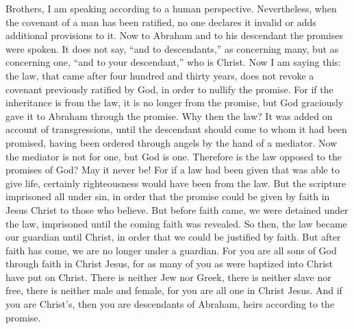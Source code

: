 \begin{biblechapter}
 Brothers, I am speaking according to a human perspective. Nevertheless, when the covenant of a man has been ratified, no one declares it invalid or adds additional provisions to it.
\verse Now to Abraham and to his descendant the promises were spoken. It does not say, “and to descendants,” as concerning many, but as concerning one, “and to your descendant,” who is Christ.
\verse Now I am saying this: the law, that came after four hundred and thirty years, does not revoke a covenant previously ratified by God, in order to nullify the promise.
\verse For if the inheritance is from the law, it is no longer from the promise, but God graciously gave it to Abraham through the promise.
 Why then the law? It was added on account of transgressions, until the descendant should come to whom it had been promised, having been ordered through angels by the hand of a mediator.
\verse Now the mediator is not for one, but God is one.
\verse Therefore is the law opposed to the promises of God? May it never be! For if a law had been given that was able to give life, certainly righteousness would have been from the law.
\verse But the scripture imprisoned all under sin, in order that the promise could be given by faith in Jesus Christ to those who believe.
\verse But before faith came, we were detained under the law, imprisoned until the coming faith was revealed.
\verse So then, the law became our guardian until Christ, in order that we could be justified by faith.
\verse But after faith has come, we are no longer under a guardian.
\verse For you are all sons of God through faith in Christ Jesus,
\verse for as many of you as were baptized into Christ have put on Christ.
\verse There is neither Jew nor Greek, there is neither slave nor free, there is neither male and female, for you are all one in Christ Jesus.
\verse And if you are Christ’s, then you are descendants of Abraham, heirs according to the promise.
\end{biblechapter}

